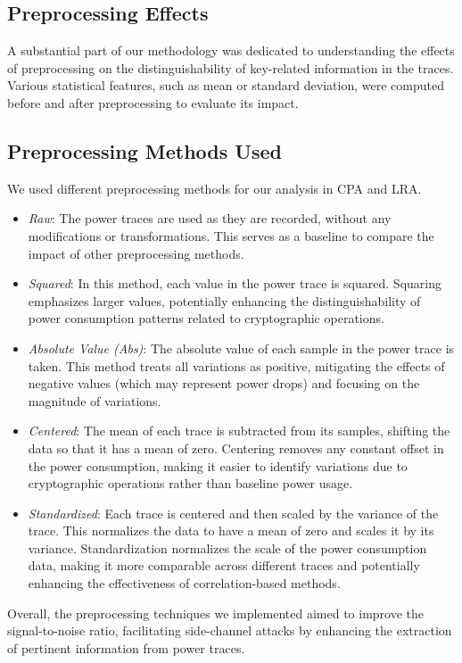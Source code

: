 \documentclass[a4paper,10pt]{article}
\begin{document}
\subsection{Preprocessing Effects}
A substantial part of our methodology was dedicated to understanding the effects of preprocessing on the distinguishability of key-related information in the traces.
Various statistical features, such as mean or standard deviation, were computed before and after preprocessing to evaluate its impact.

\subsection{Preprocessing Methods Used}
We used different preprocessing methods for our analysis in CPA and LRA.
\begin{itemize}
    \item \textit{Raw}: The power traces are used as they are recorded, without any modifications or transformations. This serves as a baseline to compare the impact of other preprocessing methods.
    
    \item \textit{Squared}: In this method, each value in the power trace is squared. Squaring emphasizes larger values, potentially enhancing the distinguishability of power consumption patterns related to cryptographic operations.

    \item \textit{Absolute Value (Abs)}: The absolute value of each sample in the power trace is taken. This method treats all variations as positive, mitigating the effects of negative values (which may represent power drops) and focusing on the magnitude of variations.

    \item \textit{Centered}: The mean of each trace is subtracted from its samples, shifting the data so that it has a mean of zero. Centering removes any constant offset in the power consumption, making it easier to identify variations due to cryptographic operations rather than baseline power usage.
    
    \item \textit{Standardized}: Each trace is centered and then scaled by the variance of the trace. This normalizes the data to have a mean of zero and scales it by its variance.
    Standardization normalizes the scale of the power consumption data, making it more comparable across different traces and potentially enhancing the effectiveness of correlation-based methods.
\end{itemize}
Overall, the preprocessing techniques we implemented aimed to improve the signal-to-noise ratio, facilitating side-channel attacks by enhancing the extraction of pertinent information from power traces.
\end{document}
